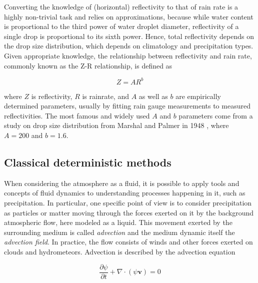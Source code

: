 Converting the knowledge of (horizontal) reflectivity to that of rain rate is a highly non-trivial task and relies on approximations, because while water content is proportional to the third power of water droplet diameter, reflectivity of a single drop is proportional to its sixth power. Hence, total reflectivity depends on the drop size distribution, which depends on climatology and precipitation types. Given appropriate knowledge, the relationship between reflectivity and rain rate, commonly known as the Z-R relationship, is defined as  

\begin{equation}
\label{eq:z-r}
	Z = AR^b
\end{equation}

where $Z$ is reflectivity, $R$ is rainrate, and $A$ as well as $b$ are empirically determined parameters, usually by fitting rain gauge measurements to measured reflectivities. The most famous and widely used $A$ and $b$ parameters come from a study on drop size distribution from Marshal and Palmer in 1948 \cite{marshall1948size}, where $A=200$ and $b=1.6$.


\subsection{Classical deterministic methods}
\label{section:classic_nowcast}


When considering the atmosphere as a fluid, it is possible to apply tools and concepts of fluid dynamics to understanding processes happening in it, such as precipitation. In particular, one specific point of view is to consider precipitation as particles or matter moving through the forces exerted on it by the background atmospheric flow, here modeled as a liquid. This movement exerted by the surrounding medium is called \textit{advection} and the medium dynamic itself the \textit{advection field}. In practice, the flow consists of winds and other forces exerted on clouds and hydrometeors. Advection is described by the advection equation

\begin{equation}
	\label{eq:adv}
	\frac{\partial \psi}{\partial t} + \nabla \cdot (\psi \pmb{v}) = 0
\end{equation}

